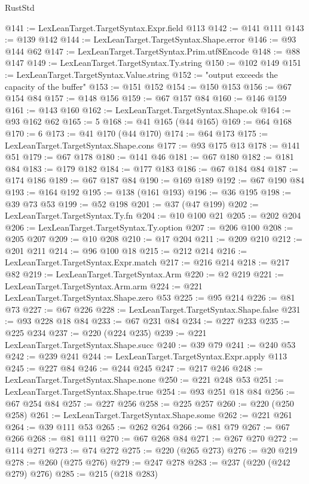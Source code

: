 \begin{lexlean}{RustStd}
\begin{coremodule}
{\begin{coremodule}
{{{{{{{{{{{{{{{{{{{{{{{{{{@141 := LexLeanTarget.TargetSyntax.Expr.field @113
@142 := @141 @111
@143 := @139 @142
@144 := LexLeanTarget.TargetSyntax.Shape.error
@146 := @93 @144 @62
@147 := LexLeanTarget.TargetSyntax.Prim.utf8Encode
@148 := @88 @147
@149 := LexLeanTarget.TargetSyntax.Ty.string
@150 := @102 @149
@151 := LexLeanTarget.TargetSyntax.Value.string
@152 := "output exceeds the capacity of the buffer"
@153 := @151 @152
@154 := @150 @153
@156 := @67 @154 @84
@157 := @148 @156
@159 := @67 @157 @84
@160 := @146 @159
@161 := @143 @160
@162 := LexLeanTarget.TargetSyntax.Shape.ok
@164 := @93 @162 @62
@165 := 5
@168 := @41 @165 (@44 @165)
@169 := @64 @168
@170 := 6
@173 := @41 @170 (@44 @170)
@174 := @64 @173
@175 := LexLeanTarget.TargetSyntax.Shape.cons
@177 := @93 @175 @13
@178 := @141 @51
@179 := @67 @178
@180 := @141 @46
@181 := @67 @180
@182 := @181 @84
@183 := @179 @182
@184 := @177 @183
@186 := @67 @184 @84
@187 := @174 @186
@189 := @67 @187 @84
@190 := @169 @189
@192 := @67 @190 @84
@193 := @164 @192
@195 := @138 (@161 @193)
@196 := @36 @195
@198 := @39 @73 @53
@199 := @52 @198
@201 := @37 (@47 @199)
@202 := LexLeanTarget.TargetSyntax.Ty.fn
@204 := @10 @100 @21
@205 := @202 @204
@206 := LexLeanTarget.TargetSyntax.Ty.option
@207 := @206 @100
@208 := @205 @207
@209 := @10 @208
@210 := @17 @204
@211 := @209 @210
@212 := @201 @211
@214 := @96 @100 @18
@215 := @212 @214
@216 := LexLeanTarget.TargetSyntax.Expr.match
@217 := @216 @214
@218 := @217 @82
@219 := LexLeanTarget.TargetSyntax.Arm
@220 := @2 @219
@221 := LexLeanTarget.TargetSyntax.Arm.arm
@224 := @221 LexLeanTarget.TargetSyntax.Shape.zero @53
@225 := @95 @214
@226 := @81 @73
@227 := @67 @226
@228 := LexLeanTarget.TargetSyntax.Shape.false
@231 := @93 @228 @18 @84
@233 := @67 @231 @84
@234 := @227 @233
@235 := @225 @234
@237 := @220 (@224 @235)
@239 := @221 LexLeanTarget.TargetSyntax.Shape.succ
@240 := @39 @79
@241 := @240 @53
@242 := @239 @241
@244 := LexLeanTarget.TargetSyntax.Expr.apply @113
@245 := @227 @84
@246 := @244 @245
@247 := @217 @246
@248 := LexLeanTarget.TargetSyntax.Shape.none
@250 := @221 @248 @53
@251 := LexLeanTarget.TargetSyntax.Shape.true
@254 := @93 @251 @18 @84
@256 := @67 @254 @84
@257 := @227 @256
@258 := @225 @257
@260 := @220 (@250 @258)
@261 := LexLeanTarget.TargetSyntax.Shape.some
@262 := @221 @261
@264 := @39 @111 @53
@265 := @262 @264
@266 := @81 @79
@267 := @67 @266
@268 := @81 @111
@270 := @67 @268 @84
@271 := @267 @270
@272 := @114 @271
@273 := @74 @272
@275 := @220 (@265 @273)
@276 := @20 @219
@278 := @260 (@275 @276)
@279 := @247 @278
@283 := @237 (@220 (@242 @279) @276)
@285 := @215 (@218 @283)
}}}}}}}}}}}}}}}}}}}}}}}}}}
\end{coremodule}}
\end{coremodule}
\end{lexlean}
